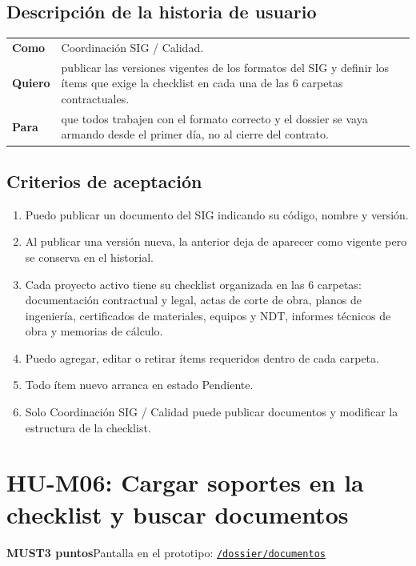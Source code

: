 \documentclass[11pt]{article}
\newcommand{\urlapp}{https://thankstochatgpt.github.io/LOARD}
\newcommand{\app}[1]{\href{\urlapp#1}{\texttt{#1}}}
\newcommand{\etiqueta}[1]{\colorbox{barra}{\textbf{\color{marca}#1}}}
\begin{document}
\subsection*{Descripción de la historia de usuario}

\begin{tabular}{>{\bfseries}p{2.4cm} p{13.4cm}}
\toprule
Como & Coordinación SIG / Calidad. \\
Quiero & publicar las versiones vigentes de los formatos del SIG y definir los ítems que exige la checklist en cada una de las 6 carpetas contractuales. \\
Para & que todos trabajen con el formato correcto y el dossier se vaya armando desde el primer día, no al cierre del contrato. \\
\bottomrule
\end{tabular}

\subsection*{Criterios de aceptación}

\begin{enumerate}
\item Puedo publicar un documento del SIG indicando su código, nombre y versión.
\item Al publicar una versión nueva, la anterior deja de aparecer como vigente pero se conserva en el historial.
\item Cada proyecto activo tiene su checklist organizada en las 6 carpetas: documentación contractual y legal, actas de corte de obra, planos de ingeniería, certificados de materiales, equipos y NDT, informes técnicos de obra y memorias de cálculo.
\item Puedo agregar, editar o retirar ítems requeridos dentro de cada carpeta.
\item Todo ítem nuevo arranca en estado Pendiente.
\item Solo Coordinación SIG / Calidad puede publicar documentos y modificar la estructura de la checklist.
\end{enumerate}


\newpage
\section*{HU-M06: Cargar soportes en la checklist y buscar documentos}
\etiqueta{MUST}\quad\etiqueta{3 puntos}\quad Pantalla en el prototipo: \app{/dossier/documentos}
\end{document}
